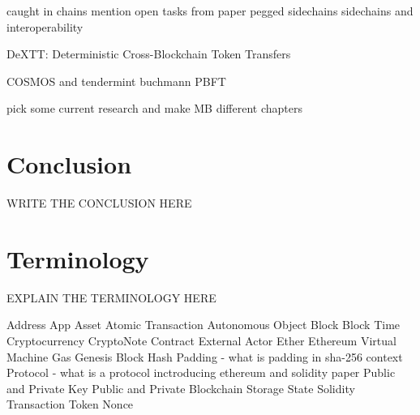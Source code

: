 caught in chains mention open tasks from paper \cite{borkowski2018caught}
pegged sidechains \cite{back2014enabling}
sidechains and interoperability \cite{johnson2019sidechains}

DeXTT: Deterministic Cross-Blockchain Token Transfers \cite{borkowski2019dextt}

COSMOS \cite{kwon2018network} and tendermint \cite{kwon2014tendermint} buchmann \cite{buchman2016tendermint} PBFT \cite{castro1999practical}

pick some current research and make MB different chapters

\chapter{Conclusion}
\label{ch:chapter07}
WRITE THE CONCLUSION HERE

\chapter{Terminology}
\label{ch:chapter08}
EXPLAIN THE TERMINOLOGY HERE

Address
App
Asset
Atomic Transaction
Autonomous Object
Block
Block Time
Cryptocurrency
CryptoNote
Contract 
External Actor
Ether
Ethereum Virtual Machine
Gas
Genesis Block
Hash
Padding - what is padding in sha-256 context
Protocol - what is a protocol inctroducing ethereum and solidity paper
Public and Private Key
Public and Private Blockchain
Storage State
Solidity
Transaction 
Token
Nonce








